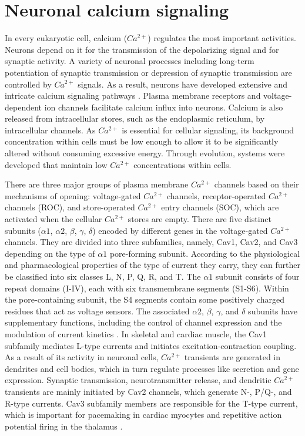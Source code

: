 \section{Neuronal calcium signaling}
In every eukaryotic cell, calcium ($Ca^{2+}$) regulates the most important activities. Neurons depend on it for the transmission of the depolarizing signal and for synaptic activity. A variety of neuronal processes including long-term potentiation of synaptic transmission or depression of synaptic transmission are controlled by $Ca^{2+}$ signals. As a result, neurons have developed extensive and intricate calcium signaling pathways \parencite{Brini2014}. Plasma membrane receptors and voltage-dependent ion channels facilitate calcium influx into neurons. Calcium is also released from intracellular stores, such as the endoplasmic reticulum, by intracellular channels. As $Ca^{2+}$ is essential for cellular signaling, its background concentration within cells must be low enough to allow it to be significantly altered without consuming excessive energy. Through evolution, systems were developed that maintain low $Ca^{2+}$ concentrations within cells. 

There are three major groups of plasma membrane $Ca^{2+}$ channels based on their mechanisms of opening: voltage-gated $Ca^{2+}$ channels, receptor-operated $Ca^{2+}$ channels (ROC), and store-operated $Ca^{2+}$ entry channels (SOC), which are activated when the cellular $Ca^{2+}$ stores are empty. There are five distinct subunits ($\alpha 1$, $\alpha 2$, $\beta$, $\gamma$, $\delta$) encoded by different genes in the voltage-gated $Ca^{2+}$ channels. They are divided into three subfamilies, namely, Cav1, Cav2, and Cav3 depending on the type of $\alpha 1$ pore-forming subunit. According to the physiological and pharmacological properties of the type of current they carry, they can further be classified into six classes L, N, P, Q, R, and T. The $\alpha 1$ subunit consists of four repeat domains (I-IV), each with six transmembrane segments (S1-S6). Within the pore-containing subunit, the S4 segments contain some positively charged residues that act as voltage sensors. The associated $\alpha 2$, $\beta$, $\gamma$, and $\delta$ subunits have supplementary functions, including the control of channel expression and the modulation of current kinetics \parencite{Hofmann1999, Catterall2000}. In skeletal and cardiac muscle, the Cav1 subfamily mediates L-type currents and initiates excitation-contraction coupling. As a result of its activity in neuronal cells, $Ca^{2+}$ transients are generated in dendrites and cell bodies, which in turn regulate processes like secretion and gene expression. Synaptic transmission, neurotransmitter release, and dendritic $Ca^{2+}$ transients are mainly initiated by Cav2 channels, which generate N-, P/Q-, and R-type currents. Cav3 subfamily members are responsible for the T-type current, which is important for pacemaking in cardiac myocytes and repetitive action potential firing in the thalamus \parencite{Catterall2011}.

